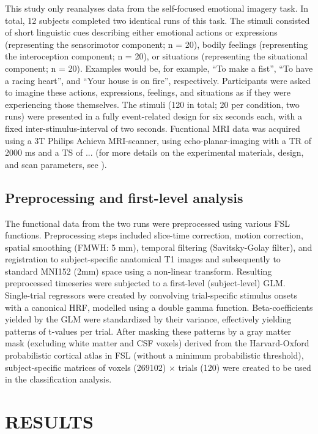 \documentclass[jou,12pt,a4paper]{apa6}
\begin{document}
This study only reanalyses data from the self-focused emotional imagery task. In total, 12 subjects completed two identical runs of this task. The stimuli consisted of short linguistic cues describing either emotional actions or expressions (representing the sensorimotor component; n = 20), bodily feelings (representing the interoception component; n = 20), or situations (representing the situational component; n = 20). Examples would be, for example, ``To make a fist'', ``To have a racing heart'', and ``Your house is on fire'', respectively. Participants were asked to imagine these actions, expressions, feelings, and situations as if they were experiencing those themselves. The stimuli (120 in total; 20 per condition, two runs) were presented in a fully event-related design for six seconds each, with a fixed inter-stimulus-interval of two seconds. Fucntional MRI data was acquired using a 3T Philips Achieva MRI-scanner, using echo-planar-imaging with a TR of 2000 ms and a TS of ... (for more details on the experimental materials, design, and scan parameters, see ).

\subsection{Preprocessing and first-level analysis}
The functional data from the two runs were preprocessed using various FSL functions. Preprocessing steps included slice-time correction, motion correction, spatial smoothing (FMWH: 5 mm), temporal filtering (Savitsky-Golay filter), and registration to subject-specific anatomical T1 images and subsequently to standard MNI152 (2mm) space using a non-linear transform. Resulting preprocessed timeseries were subjected to a first-level (subject-level) GLM. Single-trial regressors were created by convolving trial-specific stimulus onsets with a canonical HRF, modelled using a double gamma function. Beta-coefficients yielded by the GLM were standardized by their variance, effectively yielding patterns of t-values per trial. After masking these patterns by a gray matter mask (excluding white matter and CSF voxels) derived from the Harvard-Oxford probabilistic cortical atlas in FSL (without a minimum probabilistic threshold), subject-specific matrices of voxels (269102) $\times$ trials (120) were created to be used in the classification analysis.    

\section{RESULTS}
\end{document}
